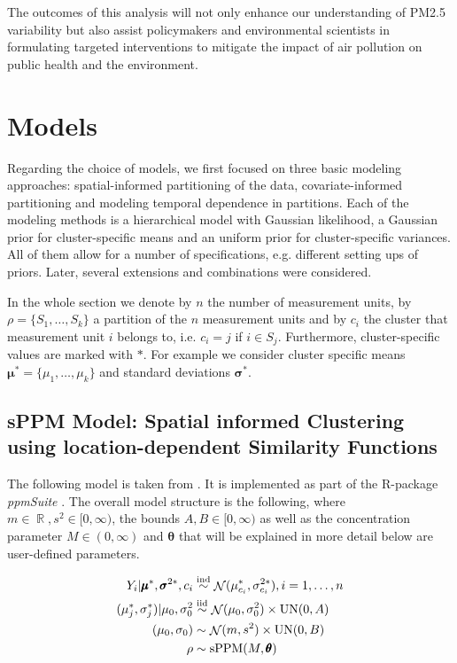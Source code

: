 \documentclass[12pt,a4paper]{article}
\DeclareMathOperator{\Normal}{\mathcal{N}}
\DeclareMathOperator{\sPPM}{\mathrm{sPPM}}
\DeclareMathOperator{\Uniform}{\mathrm{UN}}
\DeclareMathOperator{\RR}{\mathbb{R}}
\begin{document}
The outcomes of this analysis will not only enhance our understanding of PM2.5 variability but also assist policymakers and environmental scientists in formulating targeted interventions to mitigate the impact of air pollution on public health and the environment.


\section{Models}

Regarding the choice of models, we first focused on three basic modeling approaches: spatial-informed partitioning of the data, covariate-informed partitioning and modeling temporal dependence in partitions. Each of the modeling methods is a hierarchical model with Gaussian likelihood, a Gaussian prior for cluster-specific means and an uniform prior for cluster-specific variances. All of them allow for a number of specifications, e.g. different setting ups of priors. Later, several extensions and combinations were considered. \medskip

In the whole section we denote by $n$ the number of measurement units, by $\rho = \{ S_1, \dots, S_k \}$  a partition of the $n$ measurement units and by $c_i$ the cluster that measurement unit $i$ belongs to, i.e. $c_i = j$ if $i \in S_j$. Furthermore, cluster-specific values are marked with $*$. For example we consider cluster specific means $\pmb{\mu}^* = \{ \mu_1, \dots, \mu_k \}$ and standard deviations $\pmb{\sigma}^{*}$.

\subsection{sPPM Model: Spatial informed Clustering using location-dependent Similarity 
Functions} \label{subsec:sPPM-model}

The following model is taken from \cite{Page2016-Spatial}. It is implemented as part of the R-package \textit{ppmSuite} \cite{ppmSuite}.
The overall model structure is the following, where $m \in \RR, s^2 \in [0, \infty )$, the bounds $A, B \in [0, \infty)$ as well as the concentration parameter $M \in (0, \infty)$ and $\mathbf{\theta}$ that will be explained in more detail below are user-defined parameters.

\begin{align*}
    Y_i | \pmb{\mu}^*, \pmb{\sigma}^{2*}, c_i &\overset{\tiny{\mathrm{ind}}}{\sim} \Normal (\mu_{c_i}^*, \sigma_{c_i}^{2*}), i = 1, \dots, n \\
    (\mu_j^*, \sigma_j^*)  | \mu_0, \sigma_0^2 &\overset{\tiny{\mathrm{iid}}}{\sim} \Normal ( \mu_0, \sigma_0^2) \times \Uniform (0,A)\\
    (\mu_0, \sigma_0) &\sim \Normal (m, s^2) \times \Uniform (0,B)\\
    \rho &\sim \sPPM(M, \pmb{\theta})
\end{align*}
\end{document}
